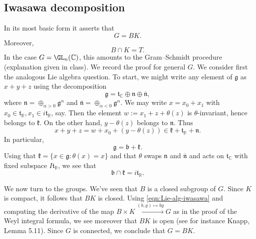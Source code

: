 \documentclass[reqno]{amsart} 
\begin{document}
\subsection{Iwasawa decomposition}
\label{sec:iwas-decomp}
In its most basic form it asserts that
\begin{equation}\label{eqn:}
  G = B  K.
\end{equation}
Moreover,
\begin{equation}\label{eqn:}
  B \cap K = T.
\end{equation}
In the case $G = \GL_n(\mathbb{C})$, this amounts to the Gram--Schmidt procedure (explanation given in class).  We record the proof for general $G$.  We consider first the analogous Lie algebra question.  To start, we might write any element of $\mathfrak{g}$ as $x + y + z$ using the decomposition
\begin{equation*}
  \mathfrak{g} = \mathfrak{t}_{\mathbb{C}} \oplus \mathfrak{n} \oplus \overline{\mathfrak{n}},
\end{equation*}
where $\mathfrak{n} = \oplus_{\alpha > 0} \mathfrak{g}^\alpha$ and $\overline{ \mathfrak{n} } = \oplus_{\alpha < 0} \mathfrak{g}^\alpha$.  We may write $x = x_0 + x_1$ with $x_0 \in \mathfrak{t}_{\mathbb{R}}, x_1 \in i \mathfrak{t}_{\mathbb{R}}$, say.  Then the element $w := x_1 + z + \theta (z)$ is $\theta$-invariant, hence belongs to $\mathfrak{k}$.  On the other hand, $y - \theta(z)$ belongs to $\mathfrak{n}$.  Thus
\begin{equation*}
  x + y + z = w + x_0 + (y - \theta(z)) \in \mathfrak{k} + \mathfrak{t}_{\mathbb{R}} + \mathfrak{n} .
\end{equation*}
In particular,
\begin{equation}\label{eqn:Lie-alg-iwasawa}
  \mathfrak{g} =
  \mathfrak{b} + \mathfrak{k}.
\end{equation}
Using that $\mathfrak{k} = \{x \in \mathfrak{g} : \theta(x) = x\}$ and that $\theta$ swaps $\mathfrak{n}$ and $\overline{\mathfrak{n}}$ and acts on $\mathfrak{t}_{\mathbb{C}}$ with fixed subspace $I \mathfrak{t}_{\mathbb{R}}$, we see that
\begin{equation}\label{eqn:}
  \mathfrak{b} \cap \mathfrak{k} = i \mathfrak{t}_{\mathbb{R}}.
\end{equation}

We now turn to the groups.  We've seen that $B$ is a closed subgroup of $G$.  Since $K$ is compact, it follows that $B K$ is closed.  Using \eqref{eqn:Lie-alg-iwasawa} and computing the derivative of the map $B \times K \xrightarrow{(b,g) \mapsto b g } G$ as in the proof of the Weyl integral formula, we see moreover that $B K$ is open (see for instance Knapp, Lemma 5.11).  Since $G$ is connected, we conclude that $G = B K$.
\end{document}
